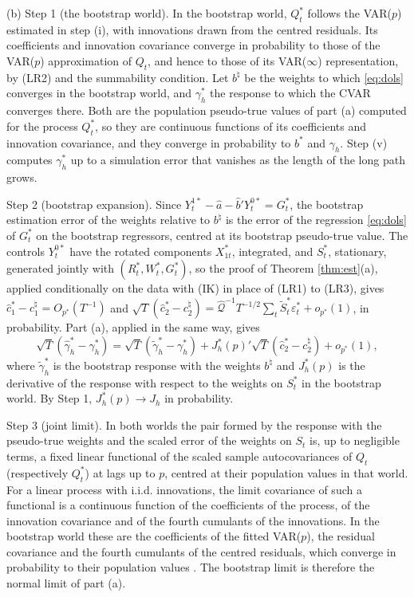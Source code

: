 \documentclass[12pt,a4paper]{article}
\theoremstyle{definition}
\theoremstyle{definition}\newtheorem{example}{Example}
\theoremstyle{definition}\newtheorem{definition}{Definition}
\begin{document}
(b) Step 1 (the bootstrap world). In the bootstrap world, $Q^\ast_t$ follows the VAR($p$) estimated in step (i), with innovations drawn from the centred residuals. Its coefficients and innovation covariance converge in probability to those of the VAR($p$) approximation of $Q_t$, and hence to those of its VAR($\infty$) representation, by (LR2) and the summability condition. Let $b^\natural$ be the weights to which \eqref{eq:dols} converges in the bootstrap world, and $\gamma^\ast_h$ the response to which the CVAR converges there. Both are the population pseudo-true values of part (a) computed for the process $Q^\ast_t$, so they are continuous functions of its coefficients and innovation covariance, and they converge in probability to $b^\ast$ and $\gamma_h$. Step (v) computes $\gamma^\ast_h$ up to a simulation error that vanishes as the length of the long path grows.

Step 2 (bootstrap expansion). Since $Y^{1\ast}_t-\hat a-\hat b'Y^{0\ast}_t=G^\ast_t$, the bootstrap estimation error of the weights relative to $b^\natural$ is the error of the regression \eqref{eq:dols} of $G^\ast_t$ on the bootstrap regressors, centred at its bootstrap pseudo-true value. The controls $Y^{0\ast}_t$ have the rotated components $X^\ast_{1t}$, integrated, and $S^\ast_t$, stationary, generated jointly with $(R^\ast_t,W^\ast_t,G^\ast_t)$, so the proof of Theorem \ref{thm:est}(a), applied conditionally on the data with (IK) in place of (LR1) to (LR3), gives $\hat c^\ast_1-c^\natural_1=O_{p^\ast}(T^{-1})$ and $\sqrt{T}(\hat c^\ast_2-c^\natural_2)=\hat{\mathcal Q}^{-1}T^{-1/2}\sum_t\tilde S^\ast_t\varepsilon^\ast_t+o_{p^\ast}(1)$, in probability. Part (a), applied in the same way, gives
\[
\sqrt{T}(\hat\gamma^\ast_h-\gamma^\ast_h)=\sqrt{T}(\tilde\gamma^\ast_h-\gamma^\ast_h)+J^\ast_h(p)'\sqrt{T}(\hat c^\ast_2-c^\natural_2)+o_{p^\ast}(1),
\]
where $\tilde\gamma^\ast_h$ is the bootstrap response with the weights $b^\natural$ and $J^\ast_h(p)$ is the derivative of the response with respect to the weights on $S^\ast_t$ in the bootstrap world. By Step 1, $J^\ast_h(p)\to J_h$ in probability.

Step 3 (joint limit). In both worlds the pair formed by the response with the pseudo-true weights and the scaled error of the weights on $S_t$ is, up to negligible terms, a fixed linear functional of the scaled sample autocovariances of $Q_t$ (respectively $Q^\ast_t$) at lags up to $p$, centred at their population values in that world. For a linear process with i.i.d. innovations, the limit covariance of such a functional is a continuous function of the coefficients of the process, of the innovation covariance and of the fourth cumulants of the innovations. In the bootstrap world these are the coefficients of the fitted VAR($p$), the residual covariance and the fourth cumulants of the centred residuals, which converge in probability to their population values \citep{InoueKilian2002}. The bootstrap limit is therefore the normal limit of part (a).
\end{document}
